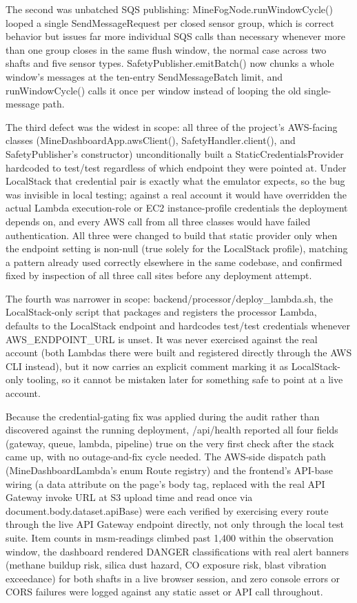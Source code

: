 \documentclass[conference]{IEEEtran}
\begin{document}
The second was unbatched SQS publishing: MineFogNode.runWindowCycle() looped a single SendMessageRequest per closed sensor group, which is correct behavior but issues far more individual SQS calls than necessary whenever more than one group closes in the same flush window, the normal case across two shafts and five sensor types. SafetyPublisher.emitBatch() now chunks a whole window's messages at the ten-entry SendMessageBatch limit, and runWindowCycle() calls it once per window instead of looping the old single-message path.

The third defect was the widest in scope: all three of the project's AWS-facing classes (MineDashboardApp.awsClient(), SafetyHandler.client(), and SafetyPublisher's constructor) unconditionally built a StaticCredentialsProvider hardcoded to test/test regardless of which endpoint they were pointed at. Under LocalStack that credential pair is exactly what the emulator expects, so the bug was invisible in local testing; against a real account it would have overridden the actual Lambda execution-role or EC2 instance-profile credentials the deployment depends on, and every AWS call from all three classes would have failed authentication. All three were changed to build that static provider only when the endpoint setting is non-null (true solely for the LocalStack profile), matching a pattern already used correctly elsewhere in the same codebase, and confirmed fixed by inspection of all three call sites before any deployment attempt.

The fourth was narrower in scope: backend/processor/deploy\_lambda.sh, the LocalStack-only script that packages and registers the processor Lambda, defaults to the LocalStack endpoint and hardcodes test/test credentials whenever AWS\_ENDPOINT\_URL is unset. It was never exercised against the real account (both Lambdas there were built and registered directly through the AWS CLI instead), but it now carries an explicit comment marking it as LocalStack-only tooling, so it cannot be mistaken later for something safe to point at a live account.

Because the credential-gating fix was applied during the audit rather than discovered against the running deployment, /api/health reported all four fields (gateway, queue, lambda, pipeline) true on the very first check after the stack came up, with no outage-and-fix cycle needed. The AWS-side dispatch path (MineDashboardLambda's enum Route registry) and the frontend's API-base wiring (a data attribute on the page's body tag, replaced with the real API Gateway invoke URL at S3 upload time and read once via document.body.dataset.apiBase) were each verified by exercising every route through the live API Gateway endpoint directly, not only through the local test suite. Item counts in msm-readings climbed past 1,400 within the observation window, the dashboard rendered DANGER classifications with real alert banners (methane buildup risk, silica dust hazard, CO exposure risk, blast vibration exceedance) for both shafts in a live browser session, and zero console errors or CORS failures were logged against any static asset or API call throughout.
\end{document}
